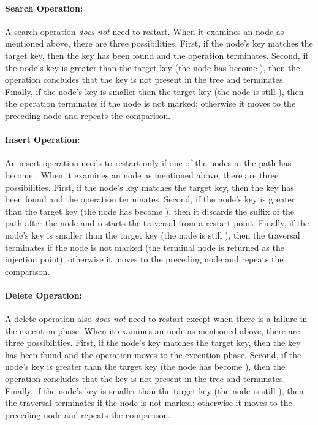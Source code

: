 \paragraph{Search Operation:} A search operation \emph{does not} need to restart. When it examines an \myanchor{} node as mentioned above, there are three possibilities. First, if the \myanchor{} node's key matches the target key, then the key has been found and the operation terminates. Second, if the \myanchor{} node's key is greater than the target key (the \myanchor{} node has become \myinconsistent{}), then the operation concludes that the key is not  present in the tree and terminates. Finally, if the \myanchor{} node's key is smaller than the target key (the \myanchor{} node is still \myconsistent{}), then the operation terminates if the node is not marked; otherwise it moves to the preceding \myanchor{} node and repeats the comparison. 



\paragraph{Insert Operation:} An insert operation needs to restart only if one of the \myanchor{} nodes in the path has become \myinconsistent{}. When it examines an \myanchor{} node as mentioned above, there are three possibilities. First, if the \myanchor{} node's key matches the target key, then the key has been found and the operation terminates. Second, if the \myanchor{} node's key is greater than the target key (the \myanchor{} node has become \myinconsistent{}), then it discards the suffix of the path after the \myanchor{} node and restarts the traversal from a restart point. Finally, if the \myanchor{} node's key is smaller than the target key (the \myanchor{} node is still \myconsistent{}), then the traversal terminates if the node is not marked (the terminal node is returned  as the injection point); otherwise it moves to the preceding \myanchor{} node and repeats the comparison.

\paragraph{Delete Operation:} 
A delete operation also \emph{does not} need to restart except when there is a failure in the execution phase. When it examines an \myanchor{} node as mentioned above, there are three possibilities. First, if the \myanchor{} node's key matches the target key, then the key has been found and the operation moves to the execution phase. Second, if the \myanchor{} node's key is greater than the target key (the \myanchor{} node has become \myinconsistent{}), then the operation concludes that the key is not present in the tree and terminates. Finally, if the \myanchor{} node's key is smaller than the target key (the \myanchor{} node is still \myconsistent{}), then the traversal terminates if the node is not marked; otherwise it moves to the preceding \myanchor{} node and repeats the comparison.